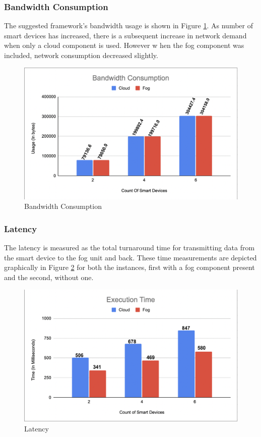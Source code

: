 \documentclass[10pt]{article}
\begin{document}
\subsubsection{Bandwidth Consumption}
The suggested framework's bandwidth usage is shown in Figure \ref{fig:11}. As number of smart devices has increased, there is a subsequent increase in network demand when only a cloud component is used. However w hen the fog component was included, network consumption decreased slightly.
\begin{figure}[H]
    \begin{center}
        \includegraphics[width=0.7\linewidth,frame]{CA2-template/RIC11.png}
       \caption{Bandwidth Consumption \label{fig:11}}
    \end{center}
\end{figure}


\subsubsection{Latency}
The latency is measured as the total turnaround time for transmitting data from the smart device to the fog unit and back. These time measurements are depicted graphically in Figure \ref{fig:10} for both the instances, first with a fog component present and the second, without one.
\begin{figure}[H]
    \begin{center}
        \includegraphics[width=0.7\linewidth,frame]{CA2-template/RIC12.png}
       \caption{Latency \label{fig:10}}
    \end{center}
\end{figure}
\end{document}
